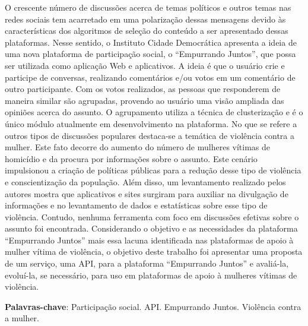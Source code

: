\begin{resumo}
O crescente número de discussões acerca de temas políticos e outros temas nas redes sociais tem acarretado em uma polarização 
dessas mensagens devido às características dos algoritmos de seleção do conteúdo a ser apresentado dessas plataformas. 
Nesse sentido, o Instituto Cidade Democrática 
apresenta a ideia de uma nova plataforma de participação social, o ``Empurrando Juntos'', que possa ser utilizada como aplicação Web e aplicativos. 
A ideia é que o 
usuário crie e participe de conversas, realizando comentários e/ou votos em um comentário de outro participante. Com os votos realizados, as pessoas que 
responderem de maneira similar são agrupadas, provendo ao usuário uma visão ampliada das opiniões acerca do assunto. O agrupamento utiliza a técnica de 
clusterização e é o único módulo atualmente em desenvolvimento na plataforma. No que se refere a outros tipos de discussões populares destaca-se a 
temática de violência 
contra a mulher. Este fato decorre do aumento do número de mulheres vítimas de homicídio e da procura por informações sobre o assunto. 
Este cenário impulsionou a 
criação de políticas públicas para a redução desse tipo de violência e conscientização da população. Além disso, um levantamento realizado pelos autores 
mostra que aplicativos e sites surgiram para auxiliar na divulgação de informações e no levantamento de dados e estatísticas sobre esse tipo de violência. 
Contudo, nenhuma ferramenta com foco em discussões efetivas sobre o assunto foi encontrada. Considerando 
o objetivo e as necessidades da plataforma ``Empurrando Juntos'' mais essa lacuna identificada nas plataformas de apoio à mulher
vítima de violência, o objetivo deste trabalho foi apresentar uma proposta de um serviço, uma API, 
para a plataforma 
``Empurrando Juntos'' e avaliá-la, evoluí-la, se necessário, para uso em plataformas de apoio à mulheres vítimas de violência. 
\vspace{\onelineskip}
  
\noindent
\textbf{Palavras-chave}: Participação social. API. Empurrando Juntos. Violência contra a mulher.
\end{resumo}
